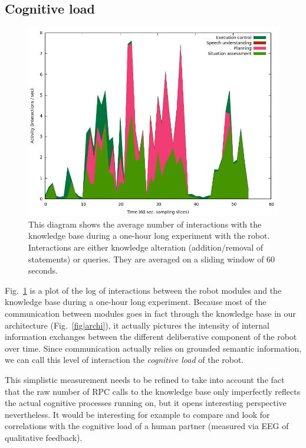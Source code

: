 \documentclass[letterpaper, 10 pt, conference]{ieeeconf}  %
\begin{document}
\subsection{Cognitive load}

\begin{figure}
        \centering
        \includegraphics[width=\columnwidth]{figs/cognitive_load.png}
        \caption{This diagram shows the average number of interactions with the
        knowledge base during a one-hour long experiment with the robot.
        Interactions are either knowledge alteration (addition/removal of
        statements) or queries. They are averaged on a sliding window of 60 seconds.}
        \label{fig|cognitiveload}
\end{figure}

Fig.~\ref{fig|cognitiveload} is a plot of the log of interactions between the
robot modules and the knowledge base during a one-hour long experiment. Because
most of the communication between modules goes in fact through the knowledge
base in our architecture (Fig.~\ref{fig|archi}), it actually pictures the
intensity of internal information exchanges between the different deliberative
component of the robot over time. Since communication actually relies on
grounded semantic information, we can call this level of interaction the
\emph{cognitive load} of the robot.

This simplistic measurement needs to be refined to take into account the fact
that the raw number of RPC calls to the knowledge base only imperfectly
reflects the actual cognitive processes running on, but it opens interesting
perspective nevertheless. It would be interesting for example to compare
and look for correlations with the cognitive load of a human partner (measured
via EEG of qualitative feedback).
\end{document}
